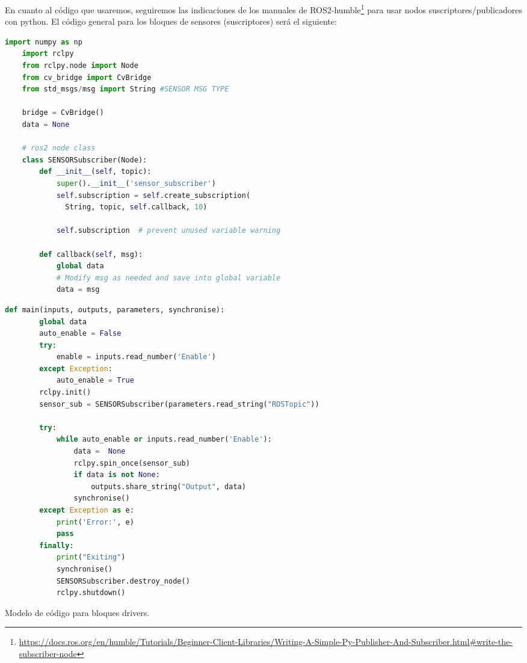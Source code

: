 En cuanto al código que usaremos, seguiremos las indicaciones de los manuales de
ROS2-humble\footnote{\url{https://docs.ros.org/en/humble/Tutorials/Beginner-Client-Libraries/Writing-A-Simple-Py-Publisher-And-Subscriber.html\#write-the-subscriber-node}}
para usar nodos suscriptores/publicadores con python. El código general para los bloques de sensores (suscriptores) será el siguiente:

\begin{code}[H]
  \begin{lstlisting}[language=python]
    import numpy as np
    import rclpy
    from rclpy.node import Node
    from cv_bridge import CvBridge
    from std_msgs/msg import String #SENSOR MSG TYPE
    
    bridge = CvBridge()
    data = None
    
    # ros2 node class
    class SENSORSubscriber(Node):
        def __init__(self, topic):
            super().__init__('sensor_subscriber')
            self.subscription = self.create_subscription(
              String, topic, self.callback, 10)

            self.subscription  # prevent unused variable warning
    
        def callback(self, msg):
            global data
            # Modify msg as needed and save into global variable
            data = msg
  \end{lstlisting}
\end{code}
\begin{code}[H]
  \begin{lstlisting}[language=python]
    def main(inputs, outputs, parameters, synchronise):
        global data
        auto_enable = False
        try:
            enable = inputs.read_number('Enable')
        except Exception:
            auto_enable = True
        rclpy.init()
        sensor_sub = SENSORSubscriber(parameters.read_string("ROSTopic"))

        try:
            while auto_enable or inputs.read_number('Enable'):
                data =  None
                rclpy.spin_once(sensor_sub)
                if data is not None:
                    outputs.share_string("Output", data)
                synchronise()
        except Exception as e:
            print('Error:', e)
            pass
        finally:
            print("Exiting")
            synchronise()     
            SENSORSubscriber.destroy_node()
            rclpy.shutdown()
  \end{lstlisting}
  \caption[Modelo de código para bloques drivers]{Modelo de código para bloques drivers.}
  \label{cod:bloques_drivers_sensors_total}
\end{code}


